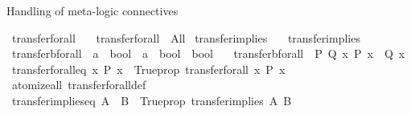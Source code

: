 \begin{isabellebody}
\begin{isamarkuptext}%
Handling of meta-logic connectives%
\end{isamarkuptext}\isamarkuptrue%
\isamarkupfalse%
\ transfer{\isacharunderscore}{\kern0pt}forall\ \isanewline
\ \ {\isachardoublequoteopen}transfer{\isacharunderscore}{\kern0pt}forall\ {\isasymequiv}\ All{\isachardoublequoteclose}\isanewline
\isanewline
{}\isamarkupfalse%
\ transfer{\isacharunderscore}{\kern0pt}implies\ \isanewline
\ \ {\isachardoublequoteopen}transfer{\isacharunderscore}{\kern0pt}implies\ {\isasymequiv}\ {\isacharparenleft}{\kern0pt}{\isasymlongrightarrow}{\isacharparenright}{\kern0pt}{\isachardoublequoteclose}\isanewline
\isanewline
{}\isamarkupfalse%
\ transfer{\isacharunderscore}{\kern0pt}bforall\ {\isacharcolon}{\kern0pt}{\isacharcolon}{\kern0pt}\ {\isachardoublequoteopen}{\isacharparenleft}{\kern0pt}{\isacharprime}{\kern0pt}a\ {\isasymRightarrow}\ bool{\isacharparenright}{\kern0pt}\ {\isasymRightarrow}\ {\isacharparenleft}{\kern0pt}{\isacharprime}{\kern0pt}a\ {\isasymRightarrow}\ bool{\isacharparenright}{\kern0pt}\ {\isasymRightarrow}\ bool{\isachardoublequoteclose}\isanewline
\ \ \ {\isachardoublequoteopen}transfer{\isacharunderscore}{\kern0pt}bforall\ {\isasymequiv}\ {\isacharparenleft}{\kern0pt}{\isasymlambda}P\ Q{\isachardot}{\kern0pt}\ {\isasymforall}x{\isachardot}{\kern0pt}\ P\ x\ {\isasymlongrightarrow}\ Q\ x{\isacharparenright}{\kern0pt}{\isachardoublequoteclose}\isanewline
\isanewline
{}\isamarkupfalse%
\ transfer{\isacharunderscore}{\kern0pt}forall{\isacharunderscore}{\kern0pt}eq{\isacharcolon}{\kern0pt}\ {\isachardoublequoteopen}{\isacharparenleft}{\kern0pt}{\isasymAnd}x{\isachardot}{\kern0pt}\ P\ x{\isacharparenright}{\kern0pt}\ {\isasymequiv}\ Trueprop\ {\isacharparenleft}{\kern0pt}transfer{\isacharunderscore}{\kern0pt}forall\ {\isacharparenleft}{\kern0pt}{\isasymlambda}x{\isachardot}{\kern0pt}\ P\ x{\isacharparenright}{\kern0pt}{\isacharparenright}{\kern0pt}{\isachardoublequoteclose}\isanewline
%
\isadelimproof
\ \ %
\endisadelimproof
%
\isatagproof
{}\isamarkupfalse%
\ atomize{\isacharunderscore}{\kern0pt}all\ transfer{\isacharunderscore}{\kern0pt}forall{\isacharunderscore}{\kern0pt}def\ \isacommand{{\isachardot}{\kern0pt}{\isachardot}{\kern0pt}}\isamarkupfalse%
%
\endisatagproof
{\isafoldproof}%
%
\isadelimproof
\isanewline
%
\endisadelimproof
\isanewline
{}\isamarkupfalse%
\ transfer{\isacharunderscore}{\kern0pt}implies{\isacharunderscore}{\kern0pt}eq{\isacharcolon}{\kern0pt}\ {\isachardoublequoteopen}{\isacharparenleft}{\kern0pt}A\ {\isasymLongrightarrow}\ B{\isacharparenright}{\kern0pt}\ {\isasymequiv}\ Trueprop\ {\isacharparenleft}{\kern0pt}transfer{\isacharunderscore}{\kern0pt}implies\ A\ B{\isacharparenright}{\kern0pt}{\isachardoublequoteclose}\isanewline

\end{isabellebody}
